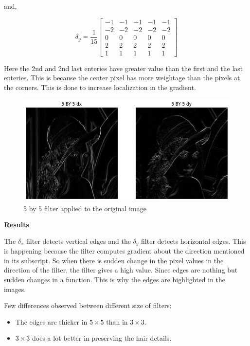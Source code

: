 and,

$$\delta_y = \frac{1}{15}
\begin{bmatrix}
-1 & -1 & -1 & -1 & -1 \\
-2 & -2 & -2 & -2 & -2 \\
0 & 0 & 0 & 0 & 0 \\
2 & 2 & 2 & 2 & 2 \\
1 & 1 & 1 & 1 & 1
\end{bmatrix}$$

Here the 2nd and 2nd last enteries have greater value than the first and the last enteries. This is because the center pixel has more weightage than the pixels at the corners. This is done to increase localization in the gradient.

\begin{figure}[H]
    \includegraphics[width=1.06\textwidth]{res/1_5_by_5.png}
    \caption{5 by 5 filter applied to the original image}\label{fig:1_5by5}
\end{figure}

\textbf{Results}

The $\delta_x$ filter detects vertical edges and the $\delta_y$ filter detects horizontal edges. This is happening because the filter computes gradient about the direction mentioned in its subscript. So when there is sudden change in the pixel values in the direction of the filter, the filter gives a high value. Since edges are nothing but sudden changes in a function. This is why the edges are highlighted in the images.

Few differences observed between different size of filters:

\begin{itemize}
    \item The edges are thicker in $5\times5$ than in $3\times3$.
    \item $3\times3$ does a lot better in preserving the hair details.
\end{itemize}